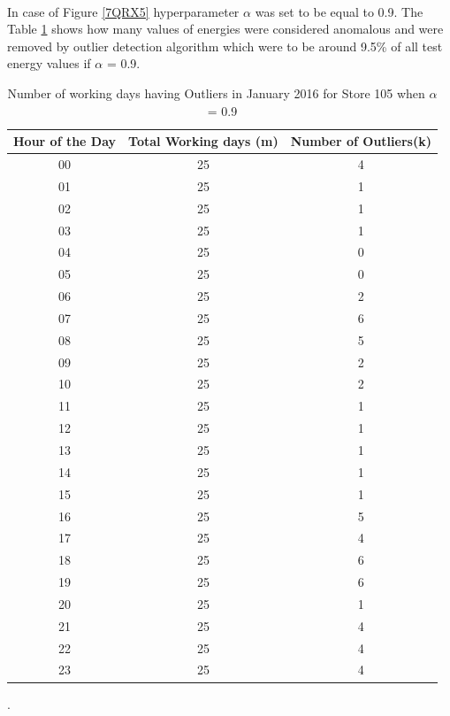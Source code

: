 \documentclass[12pt]{article}
\begin{document}
\paragraph{} In case of Figure \ref{7QRX5} hyperparameter $\alpha$  was set to be equal to 0.9. The Table \ref{table:studies2} shows how many values of energies were considered anomalous and were removed by outlier detection algorithm which were to be around 9.5\% of all test energy values if $\alpha$ = 0.9. 
\begin{table}[H]
	\centering
	{\renewcommand{\arraystretch}{1.0} 
		\begin{tabular}{|c|c|c|}
			\hline %
			Hour of the Day & Total Working days (m) & Number of Outliers(k)\\
			\hline	%
			00 & 25 &4
			\\ \hline  %
			01 & 25 & 1 \\ \hline %
			02 & 25 & 1\\  \hline  %
			03 & 25 &1 \\ 
			\hline	%
			04 & 25 & 0 \\ \hline  %
			05 & 25 & 0 \\ \hline %
			06 & 25 & 2\\  \hline  %
			07 & 25 &6 \\ 
			\hline	%
			08 & 25 &5 \\ 
			\hline	%
			09 & 25 & 2 \\ \hline  %
			10 &25 & 2\\ \hline %
			11 & 25 &1 \\  \hline  %
			12 & 25 &1 \\ 
			\hline	%
			13 &25 & 1 \\ \hline %
			14 & 25 &1 \\  \hline  %
			15 & 25 &1\\ 
			\hline	%
			16 &25 & 5 \\ \hline %
			17 & 25 & 4\\  \hline  %
			18 & 25 &6 \\ \hline
			19 & 25 & 6 \\ \hline %
			20 & 25  & 1\\  \hline  %
			21 & 25 &4 \\ 
			\hline	%
			22 &25 & 4 \\ \hline %
			23 & 25 & 4\\  \hline  %
		\end{tabular}
	}
	\caption{Number of working days having Outliers in January 2016 for Store 105 when $\alpha$ = 0.9}.
	\label{table:studies2}
\end{table}
\end{document}
